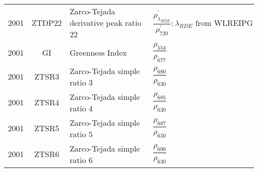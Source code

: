 \documentclass[10pt]{article}
\begin{document}
\begin{ThreePartTable}
\begin{longtable}{c c m{2.80in} M{2.80in} M{1.5in}}
  2001 & ZTDP22  & Zarco-Tejada derivative peak ratio 22                                          & $\dfrac{\rho^\prime_{\lambda_{RDE}}}{\rho^\prime_{720}} : \lambda_{RDE} \text{ from WLREIPG}$                                                                                                                                                                                           & \citet{Zarco-Tejada2001b,Miller1990}                \\
  2001 & GI      & Greenness Index                                                                & $\dfrac{\rho_{554}}{\rho_{677}}$                                                                                                                                                                                                                                                        & \citet{Zarco-Tejada2001b}                           \\
  2001 & ZTSR3   & Zarco-Tejada simple ratio 3                                                    & $\dfrac{\rho_{680}}{\rho_{630}}$                                                                                                                                                                                                                                                        & \citet{Zarco-Tejada2001a}                           \\
  2001 & ZTSR4   & Zarco-Tejada simple ratio 4                                                    & $\dfrac{\rho_{685}}{\rho_{630}}$                                                                                                                                                                                                                                                        & \citet{Zarco-Tejada2001a}                           \\
  2001 & ZTSR5   & Zarco-Tejada simple ratio 5                                                    & $\dfrac{\rho_{687}}{\rho_{630}}$                                                                                                                                                                                                                                                        & \citet{Zarco-Tejada2001a}                           \\
  2001 & ZTSR6   & Zarco-Tejada simple ratio 6                                                    & $\dfrac{\rho_{690}}{\rho_{630}}$                                                                                                                                                                                                                                                        & \citet{Zarco-Tejada2001a}                           \\

\end{longtable}
\end{ThreePartTable}
\end{document}
